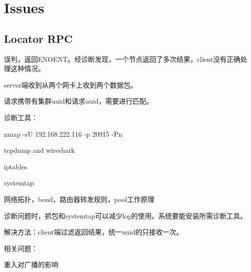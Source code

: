 \chapter{Issues}

\section{Locator RPC}

误判，返回ENOENT。经诊断发现，一个节点返回了多次结果，client没有正确处理这种情况。

server端收到从两个网卡上收到两个数据包。

请求携带有集群uuid和请求uuid，需要进行匹配。

诊断工具：
\begin{compactitem}
\item nmap -sU 192.168.222.116 -p 20915 -Pn
\item tcpdump and wireshark
\item iptables
\item systemtap
\end{compactitem}

网络拓扑，bond，路由器转发规则，pool工作原理

诊断问题时，抓包和systemtap可以减少log的使用。系统要能安装所需诊断工具。

解决方法：client端过滤返回结果，统一uuid的只接收一次。

相关问题：

重入对广播的影响

